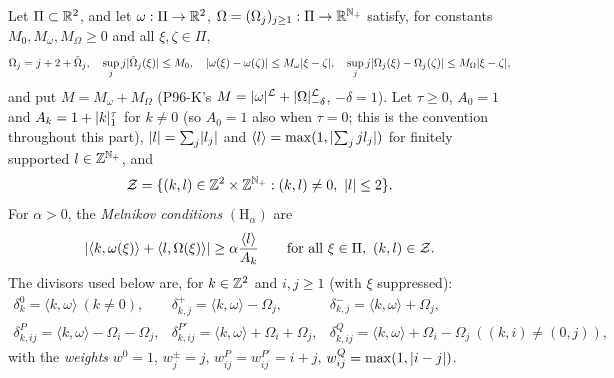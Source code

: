 \begin{definition}\label{bpW:w4:melnikov}
Let $\Pi\subset\mathbb{R}^2$, and let $\omega:\Pi\to\mathbb{R}^2$, $\Omega=(\Omega_j)_{j\ge1}:\Pi\to\mathbb{R}^{\mathbb{N}_+}$ satisfy, for constants
$M_0,M_\omega,M_\Omega\ge0$ and all $\xi,\zeta\in\Pi$,
\begin{equation}\label{bpW:w4:freq}
\Omega_j=j+2+\tilde\Omega_j,\quad\sup_jj\lvert \tilde\Omega_j(\xi)\rvert\le M_0,\quad\lvert \omega(\xi)-\omega(\zeta)\rvert\le M_\omega\lvert \xi-\zeta\rvert,\quad
\sup_jj\lvert \Omega_j(\xi)-\Omega_j(\zeta)\rvert\le M_\Omega\lvert \xi-\zeta\rvert,
\end{equation}
and put $M=M_\omega+M_\Omega$ (P96-K's $M=\lvert \omega\rvert^{\mathcal L}+\lvert \Omega\rvert^{\mathcal L}_{-\delta}$, $-\delta=1$). Let
$\tau\ge0$, $A_0=1$ and $A_k=1+\lvert k\rvert_1^\tau$ for $k\ne0$ (so $A_0=1$ also when $\tau=0$; this is the
convention throughout this part), $\lvert l\rvert=\sum_j\lvert l_j\rvert$ and $\langle l\rangle=\max(1,\lvert \sum_jjl_j\rvert)$ for finitely
supported $l\in\mathbb{Z}^{\mathbb{N}_+}$, and
\[\mathcal Z=\{(k,l)\in\mathbb{Z}^2\times\mathbb{Z}^{\mathbb{N}_+}:(k,l)\ne0,\ \lvert l\rvert\le2\}.\]
For $\alpha>0$, the \emph{Melnikov conditions} $(\mathrm H_\alpha)$ are
\[\lvert \langle k,\omega(\xi)\rangle+\langle l,\Omega(\xi)\rangle\rvert\ge\alpha\frac{\langle l\rangle}{A_k}\qquad\text{for all }\xi\in\Pi,\ (k,l)\in\mathcal Z.\]
The divisors used below are, for $k\in\mathbb{Z}^2$ and $i,j\ge1$ (with $\xi$ suppressed):
\[\begin{array}{lll}
\delta^0_k=\langle k,\omega\rangle\ (k\ne0),&\delta^+_{k,j}=\langle k,\omega\rangle-\Omega_j,&\delta^-_{k,j}=\langle k,\omega\rangle+\Omega_j,\\[2pt]
\delta^P_{k,ij}=\langle k,\omega\rangle-\Omega_i-\Omega_j,&\delta^{P'}_{k,ij}=\langle k,\omega\rangle+\Omega_i+\Omega_j,&
\delta^Q_{k,ij}=\langle k,\omega\rangle+\Omega_i-\Omega_j\ ((k,i)\ne(0,j)),
\end{array}\]
with the \emph{weights} $w^0=1$, $w^\pm_j=j$, $w^P_{ij}=w^{P'}_{ij}=i+j$, $w^Q_{ij}=\max(1,\lvert i-j\rvert)$.
\end{definition}

